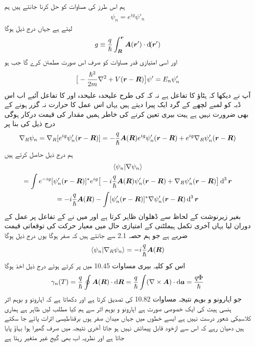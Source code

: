 ہم اس طرز کی مساوات کو حل کرنا جانتے ہیں ہم
\begin{align}
\psi_n = e^{i g} \psi'_n
\end{align}
لیتے ہے جہاں درج ذیل ہوگا 
\begin{align}
g \equiv \frac{q}{\hslash} \int_{\kvec{R}}^{\kvec{r}} \kvec{A} (\kvec{r}') \cdot \dif (\kvec{r}')
\end{align}
اور  اسی امتیازی قدر مساوات کو صرف اس صورت مطمئن کرے گا جب  ہو 
\begin{align}
\big [ - \frac{\hslash^2}{2m} \nabla^2 + V ({{\boldsymbol{r}}} - {{\boldsymbol{R}}}) \big ] \psi' = E_n \psi'_n
\end{align}
آپ نے دیکھا کہ  ہٹاؤ  کا تفاعل ہے نہ کہ  کی طرح علیحدہ علیحدہ  اور  کا تفاعل آئیے اب اس ڈبہ کو لمبے لچھے کے گرد ایک پیرا دیتے ہیں یہاں اس عمل کا حرارت نہ گزر ہونے کے بھی ضرورت نہیں ہے ہیت بیری تعین کرنے کی خاطر ہمیں مقدار  کی قیمت درکار ہوگی درج ذیل کی بنا پر 
\begin{align*}
\nabla_R \psi_n = \nabla_R [e^{i g} \psi'_n ({{\boldsymbol{r}}} - {{\boldsymbol{R}}})] = - \frac{q}{\hslash} {{\boldsymbol{A}}} ({{\boldsymbol{R}}}) e^{i g} \psi'_n ({{\boldsymbol{r}}} - {{\boldsymbol{R}}}) + e^{i g} \nabla_R \psi'_n ({{\boldsymbol{r}}} - {{\boldsymbol{R}}})
\end{align*}
ہم درج ذیل حاصل کرتے ہیں 
\begin{multline}
\langle \psi_n | \nabla \psi_n \rangle \\
= \int e^{- i g} [\psi'_n (\kvec{r} - \kvec{R})]^{*} e^{i g} \big [ - i \frac{q}{\hslash} \kvec{A} (\kvec{R}) \psi'_n (\kvec{r} - \kvec{R}) + \nabla_R \psi'_n (\kvec{r} - \kvec{R}) \big ] \dif^{\,3} \kvec{r} \\
= - i \frac{q}{\hslash} \kvec{A} (\kvec{R}) - \int [\psi'_n (\kvec{r} - \kvec{R})]^{*} \nabla \psi'_n (\kvec{r} - \kvec{R}) \dif^{\,3} \kvec{r}
\end{multline}
بغیر زیرنوشت   کے لحاظ سے ڈھلوان ظاہر کرتا ہے اور میں نے  کے تفاعل پر عمل کے دوران  لیا یہاں آخری تکمل ہیملٹنی  کے امتیازی حال میں معیار حرکت کی توقعاتی قیمت ضربے  ہے جو ہم حصہ 2.1 سے جانتے ہیں کہ صفر ہوگا یوں درج ذیل ہوگا 
\begin{align}
\langle \psi_n | \nabla_R \psi_n \rangle = - i \frac{q}{\hslash} {{\boldsymbol{A}}} ({{\boldsymbol{R}}})
\end{align}
اس کو کلیہ بیری مساوات 10.45 میں پر کرتے ہوئے درج ذیل اخذ ہوگا 
\begin{align}
\gamma_n (T) = \frac{q}{\hslash} \oint \kvec{A} (\kvec{R}) \cdot \dif \kvec{R} = \frac{q}{\hslash} \int (\nabla \times \kvec{A}) \cdot \dif \kvec{a} = \frac{q \Phi}{\hslash}
\end{align}
جو اہارونو و بوہم نتیجہ مساوات 10.82 کی تصدیق کرتا ہے اور دکھاتا ہے کہ اہارونو و بوہم اثر ہنسی ہیت کی ایک خصوصی صورت ہے اہارونو و بوہم اثر سے ہم کیا مطلب ليں ظاہر ہے ہماری کلاسیکی شعور درست نہیں ہے ایسے خطوں میں جہاں میدان صفر ہوں برقناطیسی اثرات پائے جا سکتے ہیں دھیان رہے کہ اس سے  ازخود قابل پیمائش نہیں ہو جاتا آخری نتیجہ میں صرف گھیرا ہوا بہاؤ پایا جاتا ہے اور نظریہ اب بھی گیج غیر متغیر رہتا ہے 

